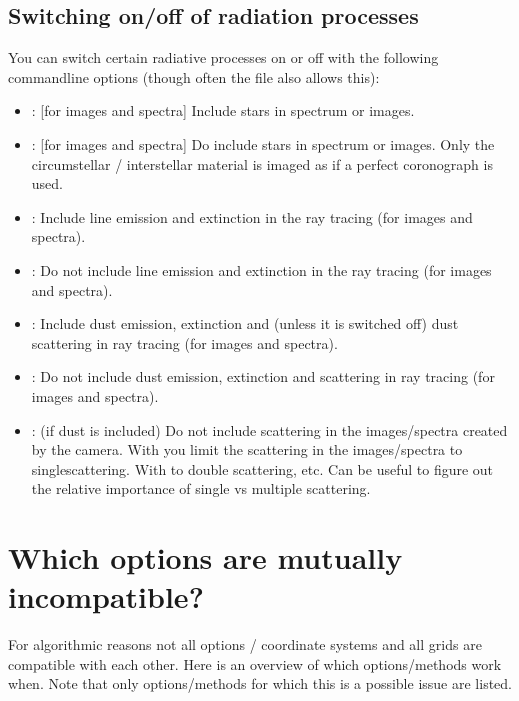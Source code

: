 \documentclass[letterpaper,10pt,english]{sphinxmanual}
\begin{document}
\section{Switching on/off of radiation processes}
\label{\detokenize{clioptions:switching-on-off-of-radiation-processes}}
You can switch certain radiative processes on or off with the following
command\sphinxhyphen{}line options (though often the  file also allows this):
\begin{itemize}
\item {} 
: {[}for images and spectra{]} Include stars in
spectrum or images.

\item {} 
: {[}for images and spectra{]} Do  include stars
in spectrum or images. Only the circumstellar / interstellar material is
imaged as if a perfect coronograph is used.

\item {} 
: Include line emission and extinction
in the ray tracing (for images and spectra).

\item {} 
: Do not include line emission and extinction
in the ray tracing (for images and spectra).

\item {} 
: Include dust emission, extinction and
(unless it is switched off) dust scattering in ray tracing (for images and
spectra).

\item {} 
: Do not include dust emission, extinction and
scattering in ray tracing (for images and spectra).

\item {} 
: (if dust is included) Do not include
scattering in the images/spectra created by the camera. With 
you limit the scattering in the images/spectra to single\sphinxhyphen{}scattering.
With  to double scattering, etc. Can be useful to
figure out the relative importance of single vs multiple scattering.

\end{itemize}


\chapter{Which options are mutually incompatible?}
\label{\detokenize{optionscompat:which-options-are-mutually-incompatible}}\label{\detokenize{optionscompat:chap-table-possibilities}}\label{\detokenize{optionscompat::doc}}
For algorithmic reasons not all options / coordinate systems and all grids
are compatible with each other. Here is an overview of which options/methods
work when. Note that only options/methods for which this is a possible issue
are listed.
\end{document}
